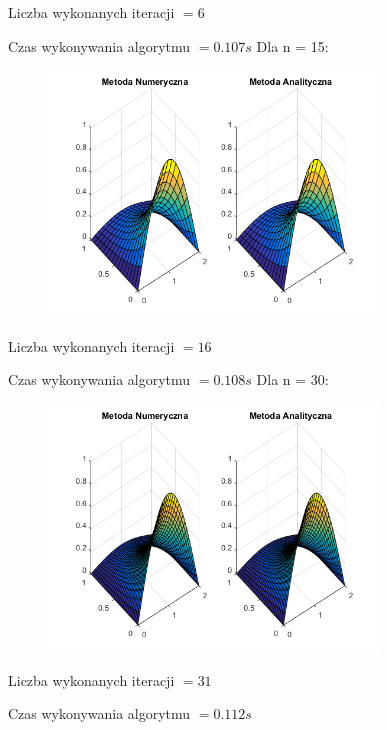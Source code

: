 Liczba wykonanych iteracji $ = 6 $

Czas wykonywania algorytmu $ = 0.107 s$
\newpage
Dla n = 15:

\begin{figure}[!ht]
	\begin{center}
		\includegraphics[width=0.78\textwidth]{Lab7/charts/cn/15.png}
	\end{center}
\end{figure}

Liczba wykonanych iteracji $ = 16 $

Czas wykonywania algorytmu $ = 0.108 s$
\FloatBarrier
Dla n = 30:

\begin{figure}[!ht]
	\begin{center}
		\includegraphics[width=0.78\textwidth]{Lab7/charts/cn/30.png}
	\end{center}
\end{figure}

Liczba wykonanych iteracji $ = 31 $

Czas wykonywania algorytmu $ = 0.112 s$

